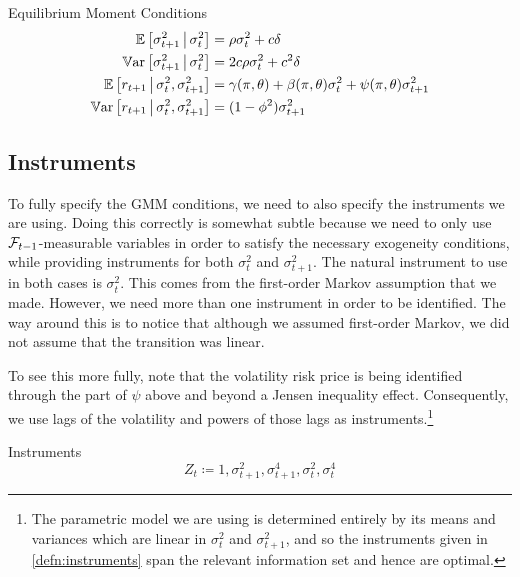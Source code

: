 \documentclass[11pt, letterpaper, twoside, final]{article}
\begin{document}
\begin{defn}{Equilibrium Moment Conditions}
    \label{defn:equilibrium_moment_conditions}
    \begin{align}
        \label{eqn:cond_vol_mean}
        \E\left[\sigma^2_{t+1} \mvert \sigma^2_t \right]  &= \rho \sigma^2_t  + c \delta\\
%
        \label{eqn:cond_vol_var}
        \Var\left[\sigma^2_{t+1} \mvert \sigma^2_t \right]  &=  2 c \rho \sigma^2_t  + c^2 \delta \\
%
        \label{eqn:cond_expected_rtn_moment}
        \E\left[r_{t+1} \mvert \sigma^2_t, \sigma^2_{t+1}\right] &= \gamma(\pi, \theta) + \beta(\pi, \theta)
        \sigma^2_t + \psi(\pi, \theta) \sigma^2_{t+1} \\
%
        \label{eqn:cond_rtn_var}
        \Var\left[r_{t+1} \mvert \sigma^2_t, \sigma^2_{t+1}\right] &= (1 - \phi^2) \sigma^2_{t+1} 
\end{align}
\end{defn}

\subsection{Instruments}\label{sec:instruments}

To fully specify the GMM conditions, we need to also specify the instruments we are using.
Doing this correctly is somewhat subtle because we need to only use $\mathcal{F}_{t-1}$-measurable variables in order to
satisfy the necessary exogeneity conditions, while providing instruments for both $\sigma^2_t$ and
$\sigma^2_{t+1}$. 
The natural instrument to use in both cases is $\sigma^2_t$.
This comes from the first-order Markov assumption that we made.
However, we need more than one instrument in order to be identified.
The way around this is to notice that although we assumed first-order Markov, we did not assume that the
transition was linear. 

To see this more fully, note that the volatility risk price is being identified through the part of $\psi$
above and beyond a Jensen inequality effect.
Consequently, we use lags of the volatility and powers of those lags as instruments.\footnote{The parametric model
we are using is determined entirely by its means and variances which are linear in $\sigma^2_t$ and
$\sigma^2_{t+1}$, and so the instruments given in \cref{defn:instruments} span the relevant information set and
hence are optimal.} 

\begin{defn}{Instruments}
    \label{defn:instruments}
    \begin{equation}
        Z_t \coloneqq 1, \sigma^2_{t+1}, \sigma^4_{t+1}, \sigma^2_{t}, \sigma^4_{t}
    \end{equation}
\end{defn}
\end{document}
